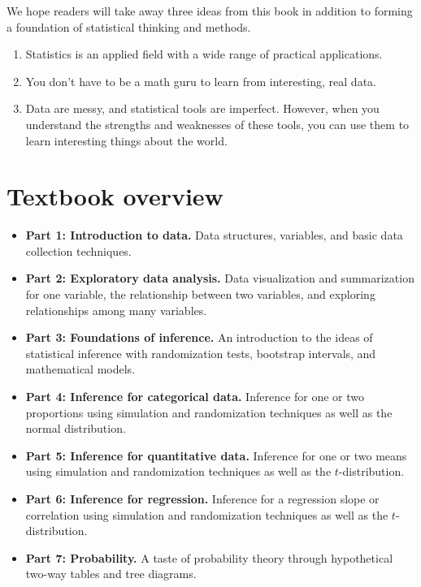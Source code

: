 \documentclass[
  10pt,
  openany]{book}
\providecommand{\tightlist}{%
  \setlength{\itemsep}{0pt}\setlength{\parskip}{0pt}}
\theoremstyle{definition}
\theoremstyle{definition}
\theoremstyle{definition}
\theoremstyle{definition}
\theoremstyle{remark}
\begin{document}
We hope readers will take away three ideas from this book in addition to forming a foundation of statistical thinking and methods.

\begin{enumerate}
\def\labelenumi{\arabic{enumi}.}
\tightlist
\item
  Statistics is an applied field with a wide range of practical applications.
\item
  You don't have to be a math guru to learn from interesting, real data.
\item
  Data are messy, and statistical tools are imperfect. However, when you understand the strengths and weaknesses of these tools, you can use them to learn interesting things about the world.
\end{enumerate}

\section*{Textbook overview}\label{textbook-overview}

\begin{itemize}
\tightlist
\item
  \textbf{Part 1: Introduction to data.} Data structures, variables, and basic data collection techniques.
\item
  \textbf{Part 2: Exploratory data analysis.} Data visualization and summarization for one variable, the relationship between two variables, and exploring relationships among many variables.
\item
  \textbf{Part 3: Foundations of inference.} An introduction to the ideas of statistical inference with randomization tests, bootstrap intervals, and mathematical models.
\item
  \textbf{Part 4: Inference for categorical data.} Inference for one or two proportions using simulation and randomization techniques as well as the normal distribution.
\item
  \textbf{Part 5: Inference for quantitative data.} Inference for one or two means using simulation and randomization techniques as well as the \(t\)-distribution.
\item
  \textbf{Part 6: Inference for regression.} Inference for a regression slope or correlation using simulation and randomization techniques as well as the \(t\)-distribution.
\item
  \textbf{Part 7: Probability.} A taste of probability theory through hypothetical two-way tables and tree diagrams.
\end{itemize}
\end{document}

